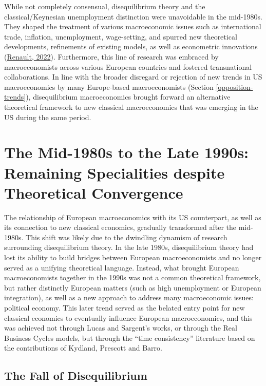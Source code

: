 \documentclass[
  12pt,
  onecolumn]{article}
\begin{document}
While not completely consensual, disequilibrium theory and the classical/Keynesian unemployment distinction were unavoidable in the mid-1980s. They shaped the treatment of various macroeconomic issues such as international trade, inflation, unemployment, wage-setting, and spurred new theoretical developments, refinements of existing models, as well as econometric innovations (\protect\hyperlink{ref-renault2022}{Renault, 2022}). Furthermore, this line of research was embraced by macroeconomists across various European countries and fostered transnational collaborations. In line with the broader disregard or rejection of new trends in US macroeconomics by many Europe-based macroeconomists (Section \ref{opposition-trends}), disequilibrium macroeconomics brought forward an alternative theoretical framework to new classical macroeconomics that was emerging in the US during the same period.

\hypertarget{period2}{%
\section{The Mid-1980s to the Late 1990s: Remaining Specialities despite Theoretical Convergence}\label{period2}}

The relationship of European macroeconomics with its US counterpart, as well as its connection to new classical economics, gradually transformed after the mid-1980s. This shift was likely due to the dwindling dynamism of research surrounding disequilibrium theory. In the late 1980s, disequilibrium theory had lost its ability to build bridges between European macroeconomists and no longer served as a unifying theoretical language. Instead, what brought European macroeconomists together in the 1990s was not a common theoretical framework, but rather distinctly European matters (such as high unemployment or European integration), as well as a new approach to address many macroeconomic issues: political economy. This later trend served as the belated entry point for new classical economics to eventually influence European macroeconomics, and this was achieved not through Lucas and Sargent's works, or through the Real Business Cycles models, but through the ``time consistency'' literature based on the contributions of Kydland, Prescott and Barro.

\hypertarget{disequilibrium-fall}{%
\subsection{The Fall of Disequilibrium}\label{disequilibrium-fall}}
\end{document}
